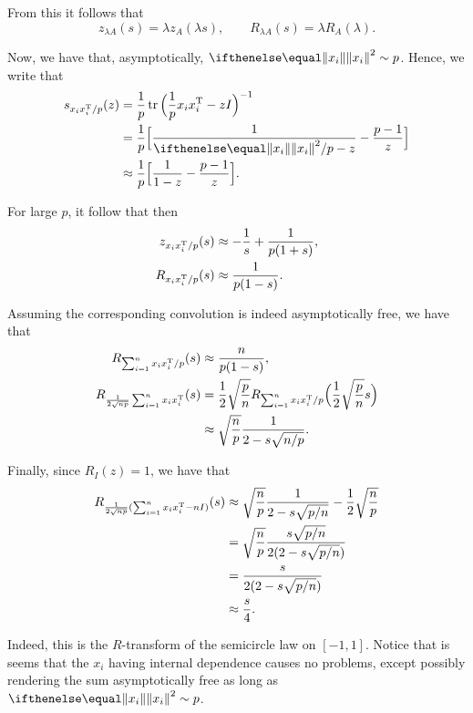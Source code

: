 \documentclass{hw-scrartcl}
\begin{document}
From this it follows that
\[
  z_{\lambda A}(s) = \lambda z_A(\lambda s),
  \qquad
  R_{\lambda A}(s) = \lambda R_A(\lambda).
\]

Now, we have that, asymptotically, \(\norm{x_i}^2 \sim p\). Hence, we write that
\begin{align*}
  s_{x_i x_i\transp/p}(z)
  &= \frac{1}{p}\Tr\Big(\frac{1}{p}x_i x_i\transp - z\Id\Big)^{-1} \\
  &= \frac{1}{p}\Big[\frac{1}{\norm{x_i}^2/p - z} - \frac{p-1}{z}\Big] \\
  &\approx \frac{1}{p}\Big[\frac{1}{1 - z} - \frac{p-1}{z}\Big].
\end{align*}

For large \(p\), it follow that then
\begin{align*}
  z_{x_i x_i^{\mathrm{T}}/p}(s)
  &\approx -\frac{1}{s} + \frac{1}{p(1 + s)}, \\
  R_{x_i x_i^{\mathrm{T}}/p}(s)
  &\approx \frac{1}{p(1 - s)}.
\end{align*}

Assuming the corresponding convolution is indeed asymptotically free, we have that
\begin{align*}
  R_{\sum_{i=1}^n x_i x_i^{\mathrm{T}}/p}(s)
  &\approx \frac{n}{p(1-s)}, \\
  R_{\frac{1}{2\sqrt{np}}\sum_{i=1}^n x_i x_i^{\mathrm{T}}}(s)
  &= \frac{1}{2}\sqrt{\frac{p}{n}} R_{\sum_{i=1}^n x_i x_i^{\mathrm{T}}/p}\Big(\frac{1}{2}\sqrt{\frac{p}{n}}s\Big) \\
  &\approx  \sqrt{\frac{n}{p}}\frac{1}{2 - s\sqrt{n/p}}.
\end{align*}

Finally, since \(R_I(z) = 1\), we have that
\begin{align*}
  R_{\frac{1}{2\sqrt{np}}(\sum_{i=1}^n x_i x_i^{\mathrm{T}} - nI)}(s)
  &\approx \sqrt{\frac{n}{p}}\frac{1}{2 - s\sqrt{p/n}} - \frac{1}{2}\sqrt{\frac{n}{p}} \\
  &= \sqrt{\frac{n}{p}} \frac{s\sqrt{p/n}}{2(2 - s\sqrt{p/n})}\\
  &= \frac{s}{2(2 - s\sqrt{p/n})} \\
  &\approx \frac{s}{4}.
\end{align*}

Indeed, this is the \(R\)-transform of the semicircle law on \([-1, 1]\). Notice that is seems that the \(x_i\) having internal dependence causes no problems, except possibly rendering the sum asymptotically free as long as \(\norm{x_i}^2 \sim p\).
\end{document}
